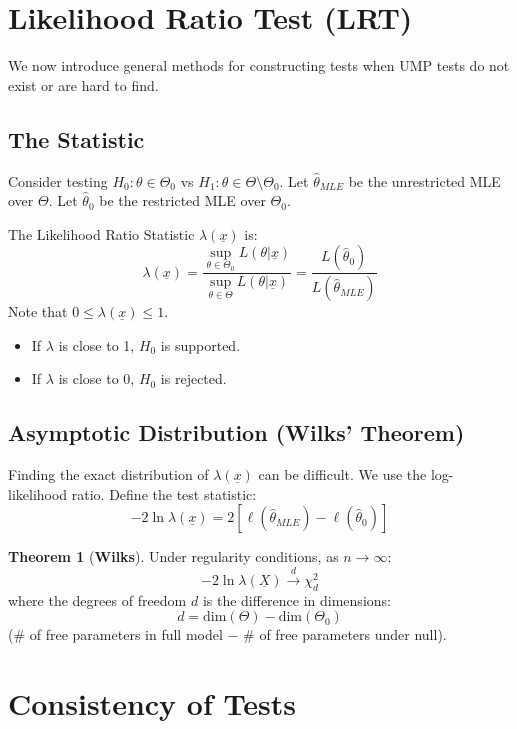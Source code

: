\documentclass[12pt, a4paper]{article}
\theoremstyle{definition}
\newtheorem{theorem}{Theorem}
\newcommand{\xvec}{\underline{x}}
\newcommand{\Xvec}{\underline{X}}
\begin{document}
\section{Likelihood Ratio Test (LRT)}

We now introduce general methods for constructing tests when UMP tests do not exist or are hard to find.

\subsection{The Statistic}
Consider testing $H_0: \theta \in \Theta_0$ vs $H_1: \theta \in \Theta \setminus \Theta_0$.
Let $\hat{\theta}_{MLE}$ be the unrestricted MLE over $\Theta$.
Let $\hat{\theta}_{0}$ be the restricted MLE over $\Theta_0$.

The Likelihood Ratio Statistic $\lambda(\xvec)$ is:
$$ \lambda(\xvec) = \frac{\sup_{\theta \in \Theta_0} L(\theta | \xvec)}{\sup_{\theta \in \Theta} L(\theta | \xvec)} = \frac{L(\hat{\theta}_0)}{L(\hat{\theta}_{MLE})} $$
Note that $0 \le \lambda(\xvec) \le 1$.
\begin{itemize}
    \item If $\lambda$ is close to 1, $H_0$ is supported.
    \item If $\lambda$ is close to 0, $H_0$ is rejected.
\end{itemize}

\subsection{Asymptotic Distribution (Wilks' Theorem)}
Finding the exact distribution of $\lambda(\xvec)$ can be difficult. We use the log-likelihood ratio.
Define the test statistic:
$$ -2 \ln \lambda(\xvec) = 2 [\ell(\hat{\theta}_{MLE}) - \ell(\hat{\theta}_0)] $$

\begin{theorem}[\textbf{Wilks}]
Under regularity conditions, as $n \to \infty$:
$$ -2 \ln \lambda(\Xvec) \xrightarrow{d} \chi^2_d $$
where the degrees of freedom $d$ is the difference in dimensions:
$$ d = \text{dim}(\Theta) - \text{dim}(\Theta_0) $$
(\# of free parameters in full model $-$ \# of free parameters under null).
\end{theorem}

\section{Consistency of Tests}
\end{document}
